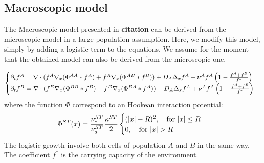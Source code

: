	\subsection{Macroscopic model}
	The Macroscopic model presented in \textbf{citation} can be derived from the microscopic model in a large population assumption. Here, we modify this model, simply by adding a logistic term to the equations. We assume for the moment that the obtained model can also be derived from the microscopic one.
	
	\begin{equation}
		\begin{cases}
	{\partial}_t f^{A}=  \nabla \cdot (f^A\nabla_x(\Phi^{AA}* f^A) + f^A \nabla_x( \Phi^{AB}*f^B)) + D_A \Delta_x f^A + \nu^{A}f^A\left( 1-\frac{f^A+f^B}{f^{*}} \right) \\
	
	{\partial}_t f^{B}=  \nabla \cdot (f^B\nabla_x(\Phi^{BB}* f^B) + f^B \nabla_x (\Phi^{BA}*f^A)) + D_A \Delta_x f^A + \nu^{A}f^A\left( 1-\frac{f^A+f^B}{f^{*}} \right)
		\end{cases}
	\end{equation}
	where the function $\Phi$ correspond to an Hookean interaction potential:
	\begin{equation}
	\Phi^{ST}(x)=\frac{\nucST}{\nudST}\frac{\KST}{2}
	 \begin{cases}
	  (|x|-R)^2, \quad \text{for } |x|\leq R\\
	  0, \quad \text{for } |x|> R
	 \end{cases}
	\end{equation}
	The logistic growth involve both cells of population $A$ and $B$ in the same way. The coefficient $f^*$ is the carrying capacity of the environment.
